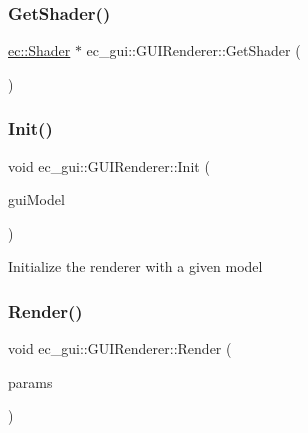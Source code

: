 \subsubsection{\texorpdfstring{Get\+Shader()}{GetShader()}}
{\footnotesize\ttfamily \mbox{\hyperlink{classec_1_1_shader}{ec\+::\+Shader}} $\ast$ ec\+\_\+gui\+::\+G\+U\+I\+Renderer\+::\+Get\+Shader (\begin{DoxyParamCaption}{ }\end{DoxyParamCaption})}

\mbox{\label{classec__gui_1_1_g_u_i_renderer_acc450ad133730bae2e9cc39bf5565a63}} 
\subsubsection{\texorpdfstring{Init()}{Init()}}
{\footnotesize\ttfamily void ec\+\_\+gui\+::\+G\+U\+I\+Renderer\+::\+Init (\begin{DoxyParamCaption}\item[{\mbox{\hyperlink{classec__gui_1_1_g_u_i_model}{G\+U\+I\+Model}} $\ast$}]{gui\+Model }\end{DoxyParamCaption})}

Initialize the renderer with a given model \mbox{\label{classec__gui_1_1_g_u_i_renderer_a92e0ffad2a4d6f749f764af78f6965d6}} 
\subsubsection{\texorpdfstring{Render()}{Render()}\hspace{0.1cm}{\footnotesize\ttfamily [1/5]}}
{\footnotesize\ttfamily void ec\+\_\+gui\+::\+G\+U\+I\+Renderer\+::\+Render (\begin{DoxyParamCaption}\item[{\mbox{\hyperlink{structec__gui_1_1_g_u_i_rendering_parameter_list}{G\+U\+I\+Rendering\+Parameter\+List}}}]{params }\end{DoxyParamCaption})}

\mbox{\label{classec__gui_1_1_g_u_i_renderer_a31787542322b95eecabed8b90e3e0912}} 
